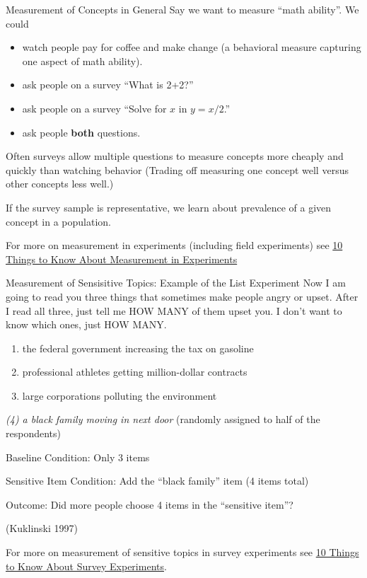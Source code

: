 \documentclass[
  ignorenonframetext,
]{beamer}
\providecommand{\tightlist}{%
  \setlength{\itemsep}{0pt}\setlength{\parskip}{0pt}}
\begin{document}
\begin{frame}{Measurement of Concepts in General}
\protect\hypertarget{measurement-of-concepts-in-general}{}
Say we want to measure ``math ability''. We could

\begin{itemize}
\tightlist
\item
  watch people pay for coffee and make change (a behavioral measure
  capturing one aspect of math ability).
\item
  ask people on a survey ``What is 2+2?''
\item
  ask people on a survey ``Solve for \(x\) in \(y=x/2\).''
\item
  ask people \textbf{both} questions.
\end{itemize}

Often surveys allow multiple questions to measure concepts more cheaply
and quickly than watching behavior (Trading off measuring one concept
well versus other concepts less well.)

If the survey sample is representative, we learn about prevalence of a
given concept in a population.

For more on measurement in experiments (including field experiments) see
\href{https://egap.org/resource/10-things-to-know-about-measurement-in-experiments/}{10
Things to Know About Measurement in Experiments}
\end{frame}

\begin{frame}[shrink]{Measurement of Sensisitive Topics: Example of the
List Experiment}
\protect\hypertarget{measurement-of-sensisitive-topics-example-of-the-list-experiment}{}
Now I am going to read you three things that sometimes make people angry
or upset. After I read all three, just tell me HOW MANY of them upset
you. I don't want to know which ones, just HOW MANY.

\begin{enumerate}
[(1)]
\item
  the federal government increasing the tax on gasoline
\item
  professional athletes getting million-dollar contracts
\item
  large corporations polluting the environment
\end{enumerate}

\emph{(4) a black family moving in next door} (randomly assigned to half
of the respondents)

Baseline Condition: Only 3 items

Sensitive Item Condition: Add the ``black family'' item (4 items total)

Outcome: Did more people choose 4 items in the ``sensitive item''?

(Kuklinski 1997)

For more on measurement of sensitive topics in survey experiments see
\href{https://egap.org/resource/10-things-to-know-about-survey-experiments/}{10
Things to Know About Survey Experiments}.
\end{frame}
\end{document}
